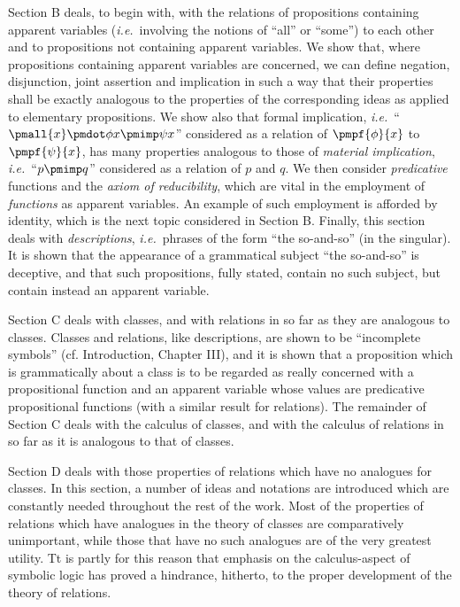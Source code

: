 \documentclass[letterpaper,12pt,openany,leqno]{book}
\newcommand{\pagefirst}[1]{\marginnote[\boxed{\text{#1}}]{\boxed{\text{#1}}}}
\begin{document}
Section B deals, to begin with, with the relations of propositions containing apparent variables (\textit{i.e.}\ involving the notions of ``all'' or ``some'') to each other and to propositions not containing apparent variables. We show that, where propositions containing apparent variables are concerned, we can define negation, disjunction, joint assertion and implication in such a way that their properties shall be exactly analogous to the properties of the corresponding ideas as applied to elementary propositions. We show also that formal implication, \textit{i.e.}\ ``$\pmall{x}\pmdot \phi x \pmimp \psi x$'' \pagefirst{92} considered as a relation of $\pmpf{\phi}{x}$ to $\pmpf{\psi}{x}$, has many properties analogous to those of \textit{material implication}, \textit{i.e.}\ ``$p \pmimp q$'' considered as a relation of $p$ and $q$. We then consider \textit{predicative} functions and the \textit{axiom of reducibility}, which are vital in the employment of \textit{functions} as apparent variables. An example of such employment is afforded by identity, which is the next topic considered in Section B. Finally, this section deals with \textit{descriptions}, \textit{i.e.}\ phrases of the form ``the so-and-so'' (in the singular). It is shown that the appearance of a grammatical subject ``the so-and-so'' is deceptive, and that such propositions, fully stated, contain no such subject, but contain instead an apparent variable. 

Section C deals with classes, and with relations in so far as they are analogous to classes. Classes and relations, like descriptions, are shown to be ``incomplete symbols'' (cf. Introduction, Chapter III), and it is shown that a proposition which is grammatically about a class is to be regarded as really concerned with a propositional function and an apparent variable whose values are predicative propositional functions (with a similar result for relations). The remainder of Section C deals with the calculus of classes, and with the calculus of relations in so far as it is analogous to that of classes.

Section D deals with those properties of relations which have no analogues for classes. In this section, a number of ideas and notations are introduced which are constantly needed throughout the rest of the work. Most of the properties of relations which have analogues in the theory of classes are comparatively unimportant, while those that have no such analogues are of the very greatest utility. Tt is partly for this reason that emphasis on the calculus-aspect of symbolic logic has proved a hindrance, hitherto, to the proper development of the theory of relations. 
\end{document}
